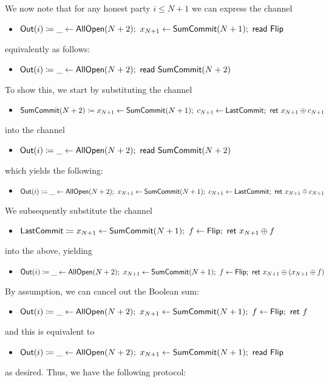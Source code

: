 \noindent We now note that for any honest party $i \leq N+1$ we can express the channel
\begin{itemize}
\item $\Out(i) \coloneqq \_ \leftarrow \AllOpen(N+2); \ x_{N+1} \leftarrow \SumCommit(N+1); \ \read{\Flip}$
\end{itemize}
equivalently as follows:
\begin{itemize}
\item $\mathsf{Out}(i) \coloneqq \_ \leftarrow \mathsf{AllOpen}(N+2); \ \mathsf{read} \ \mathsf{SumCommit}(N+2)$
\end{itemize}
To show this, we start by substituting the channel
\begin{itemize}
\item {\color{blue} $\SumCommit(N+2) \coloneqq x_{N+1} \leftarrow \SumCommit(N+1); \ c_{N+1} \leftarrow \LastCommit; \ \ret{x_{N+1} \oplus c_{N+1}}$}
\end{itemize}
into the channel
\begin{itemize}
\item $\mathsf{Out}(i) \coloneqq \_ \leftarrow \mathsf{AllOpen}(N+2); \ \mathsf{read} \ \mathsf{SumCommit}(N+2)$
\end{itemize}
which yields the following:
\begin{itemize}
\item $\mathsf{Out}(i) \coloneqq \_ \leftarrow \mathsf{AllOpen}(N+2); \ x_{N+1} \leftarrow \mathsf{SumCommit}(N+1); \ c_{N+1} \leftarrow \mathsf{LastCommit}; \ \mathsf{ret} \ x_{N+1} \oplus c_{N+1}$
\end{itemize}
We subsequently substitute the channel
\begin{itemize}
\item {\color{blue} $\mathsf{LastCommit} \coloneqq x_{N+1} \leftarrow \mathsf{SumCommit}(N+1); \ f \leftarrow \mathsf{Flip}; \ \mathsf{ret} \ x_{N+1} \oplus f$}
\end{itemize}
into the above, yielding
\begin{itemize}
\item $\mathsf{Out}(i) \coloneqq \_ \leftarrow \mathsf{AllOpen}(N+2); \ x_{N+1} \leftarrow \mathsf{SumCommit}(N+1); \ f \leftarrow \mathsf{Flip}; \ \mathsf{ret} \ x_{N+1} \oplus (x_{N+1} \oplus f)$
\end{itemize}
By assumption, we can cancel out the Boolean sum:
\begin{itemize}
\item $\mathsf{Out}(i) \coloneqq \_ \leftarrow \mathsf{AllOpen}(N+2); \ x_{N+1} \leftarrow \mathsf{SumCommit}(N+1); \ f \leftarrow \mathsf{Flip}; \ \mathsf{ret} \ f$
\end{itemize}
and this is equivalent to
\begin{itemize}
\item $\Out(i) \coloneqq \_ \leftarrow \AllOpen(N+2); \ x_{N+1} \leftarrow \SumCommit(N+1); \ \read{\Flip}$
\end{itemize}
as desired. Thus, we have the following protocol:

